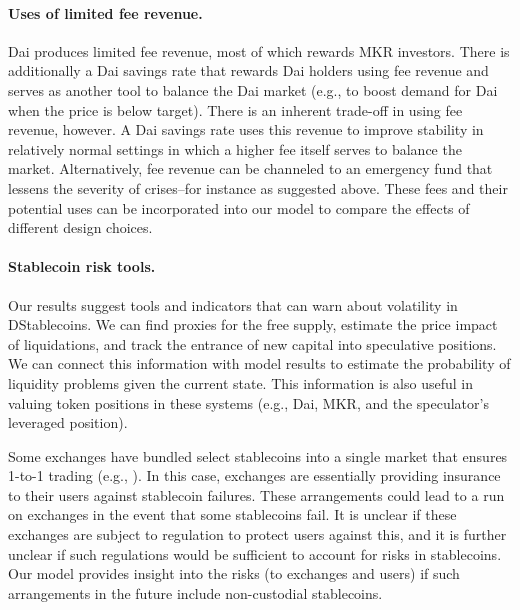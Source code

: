 \paragraph{Uses of limited fee revenue.}
Dai produces limited fee revenue, most of which rewards MKR investors. There is additionally a Dai savings rate that rewards Dai holders using fee revenue and serves as another tool to balance the Dai market (e.g., to boost demand for Dai when the price is below target). There is an inherent trade-off in using fee revenue, however. A Dai savings rate uses this revenue to improve stability in relatively normal settings in which a higher fee itself serves to balance the market. Alternatively, fee revenue can be channeled to an emergency fund that lessens the severity of crises--for instance as suggested above. These fees and their potential uses can be incorporated into our model to compare the effects of different design choices.




\paragraph{Stablecoin risk tools.}
Our results suggest tools and indicators that can warn about volatility in DStablecoins. We can find proxies for the free supply, estimate the price impact of liquidations, and track the entrance of new capital into speculative positions. We can connect this information with model results to estimate the probability of liquidity problems given the current state. This information is also useful in valuing token positions in these systems (e.g., Dai, MKR, and the speculator's leveraged position). 

Some exchanges have bundled select stablecoins into a single market that ensures 1-to-1 trading (e.g., \cite{huobi2018}). In this case, exchanges are essentially providing insurance to their users against stablecoin failures. These arrangements could lead to a run on exchanges in the event that some stablecoins fail. It is unclear if these exchanges are subject to regulation to protect users against this, and it is further unclear if such regulations would be sufficient to account for risks in stablecoins. Our model provides insight into the risks (to exchanges and users) if such arrangements in the future include non-custodial stablecoins.



